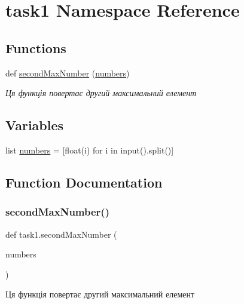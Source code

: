 \hypertarget{namespacetask1}{}\section{task1 Namespace Reference}
\label{namespacetask1}
\subsection*{Functions}
\begin{DoxyCompactItemize}
\item 
def \hyperlink{namespacetask1_a05d3aa7bb74a38f024e7de69a792dcee}{second\+Max\+Number} (\hyperlink{namespacetask1_ae2b7e0a217298571816e383a5e4970f9}{numbers})
\begin{DoxyCompactList}\small\item\em Ця функція повертає другий максимальний елемент \end{DoxyCompactList}\end{DoxyCompactItemize}
\subsection*{Variables}
\begin{DoxyCompactItemize}
\item 
list \hyperlink{namespacetask1_ae2b7e0a217298571816e383a5e4970f9}{numbers} = \mbox{[}float(i) for i in input().split()\mbox{]}
\end{DoxyCompactItemize}


\subsection{Function Documentation}
\mbox{\label{namespacetask1_a05d3aa7bb74a38f024e7de69a792dcee}} 
\subsubsection{\texorpdfstring{second\+Max\+Number()}{secondMaxNumber()}}
{\footnotesize\ttfamily def task1.\+second\+Max\+Number (\begin{DoxyParamCaption}\item[{}]{numbers }\end{DoxyParamCaption})}



Ця функція повертає другий максимальний елемент 


